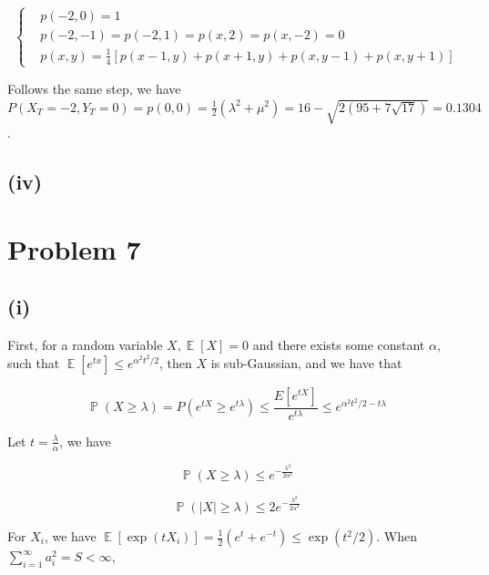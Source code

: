 \documentclass{article}
\DeclareMathOperator{\E}{\mathbb{E}}
\DeclareMathOperator{\bP}{\mathbb{P}}
\begin{document}
\begin{equation}
    \left\{
        \begin{aligned}
            &p(-2,0) = 1 \\
            &p(-2,-1) = p(-2,1) = p(x,2) = p(x,-2) = 0 \\
            &p(x,y) = \frac{1}{4}[p(x-1,y)+p(x+1,y)+p(x,y-1)+p(x,y+1)]
        \end{aligned}
    \right.
\end{equation}

Follows the same step, we have $P(X_T = -2,Y_T=0) = p(0,0) = \frac{1}{2} (\lambda^2 + \mu^2) = 16 - \sqrt{2 (95+7\sqrt{17})} = 0.1304$.


\subsection{(iv)}

\section{Problem 7}

\subsection{(i)}

First, for a random variable $X,\E[X]=0$ and there exists some constant $\alpha$, such that $\E[e^{tx}] \leqslant e^{\alpha^2 t^2/2}$, then $X$ is sub-Gaussian, and we have that 

\begin{equation}
    \bP(X \geqslant \lambda )  =  P(e^{tX} \geqslant e^{t\lambda} ) \leqslant \frac{E[e^{tX}]}{e^{t\lambda}} \leqslant e^{\alpha^2t^2/2 - t\lambda}
\end{equation}

Let $t= \frac{\lambda}{\alpha}$, we have

\begin{equation}
    \bP(X \geqslant \lambda ) \leqslant e^{-\frac{\lambda^2}{2\alpha^2}}
\end{equation}

\begin{equation}
    \bP(|X| \geqslant \lambda ) \leqslant 2e^{-\frac{\lambda^2}{2\alpha^2}}
\end{equation}

For $X_i$, we have $\E[\exp(tX_i)]  =\frac{1}{2} (e^t + e^{-t})\leqslant \exp(t^2/2)$.
When $\sum\limits_{i=1}^{\infty} a_i^2 = S < \infty$,
\end{document}
